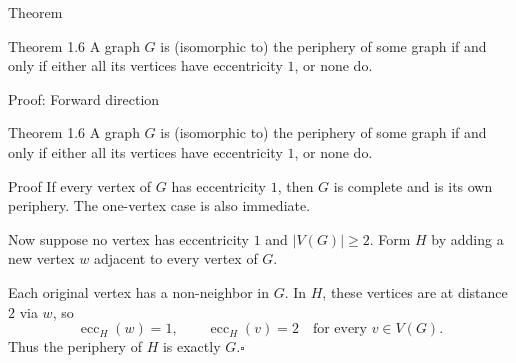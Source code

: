 \documentclass[aspectratio=169,11pt]{beamer}
\begin{document}
\begin{frame}[t]{Theorem}
\large
\vspace{0.10cm}
\begin{block}{Theorem 1.6}
A graph $G$ is (isomorphic to) the periphery of some graph if and only if
either all its vertices have eccentricity $1$, or none do.
\end{block}
\vfill
\end{frame}

\begin{frame}[t]{Proof: Forward direction}
\large
\vspace{0.10cm}
\begin{block}{Theorem 1.6}
A graph $G$ is (isomorphic to) the periphery of some graph if and only if
either all its vertices have eccentricity $1$, or none do.
\end{block}

\normalsize
\begin{block}{Proof}
If every vertex of $G$ has eccentricity $1$, then $G$ is complete and is its own periphery.
The one-vertex case is also immediate.

\smallskip
Now suppose no vertex has eccentricity $1$ and $|V(G)|\geq2$.
Form $H$ by adding a new vertex $w$ adjacent to every vertex of $G$.

\smallskip
Each original vertex has a non-neighbor in $G$. In $H$, these vertices are at distance $2$ via $w$, so
\[
\operatorname{ecc}_H(w)=1,\qquad
\operatorname{ecc}_H(v)=2\quad\text{for every }v\in V(G).
\]
Thus the periphery of $H$ is exactly $G$.\hfill$\square$
\end{block}
\end{frame}
\end{document}

